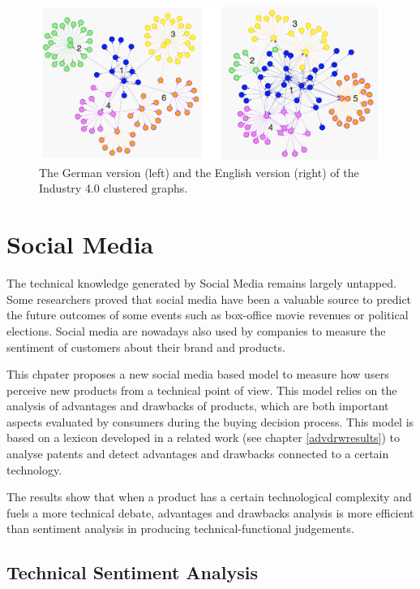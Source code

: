 \documentclass[]{book}
\begin{document}
\begin{figure}

{\centering \includegraphics[width=1\linewidth]{_bookdown_files/figures/industrie_clusters} 

}

\caption{The German version (left) and the English version (right) of the Industry 4.0 clustered graphs.}\label{fig:industrieclusters}
\end{figure}

\chapter{Social Media}\label{social-media}

The technical knowledge generated by Social Media remains largely
untapped. Some researchers proved that social media have been a valuable
source to predict the future outcomes of some events such as box-office
movie revenues or political elections. Social media are nowadays also
used by companies to measure the sentiment of customers about their
brand and products.

This chpater proposes a new social media based model to measure how
users perceive new products from a technical point of view. This model
relies on the analysis of advantages and drawbacks of products, which
are both important aspects evaluated by consumers during the buying
decision process. This model is based on a lexicon developed in a
related work (see chapter \ref{advdrwresults}) to analyse patents and
detect advantages and drawbacks connected to a certain technology.

The results show that when a product has a certain technological
complexity and fuels a more technical debate, advantages and drawbacks
analysis is more efficient than sentiment analysis in producing
technical-functional judgements.

\section{Technical Sentiment
Analysis}\label{technical-sentiment-analysis}
\end{document}
